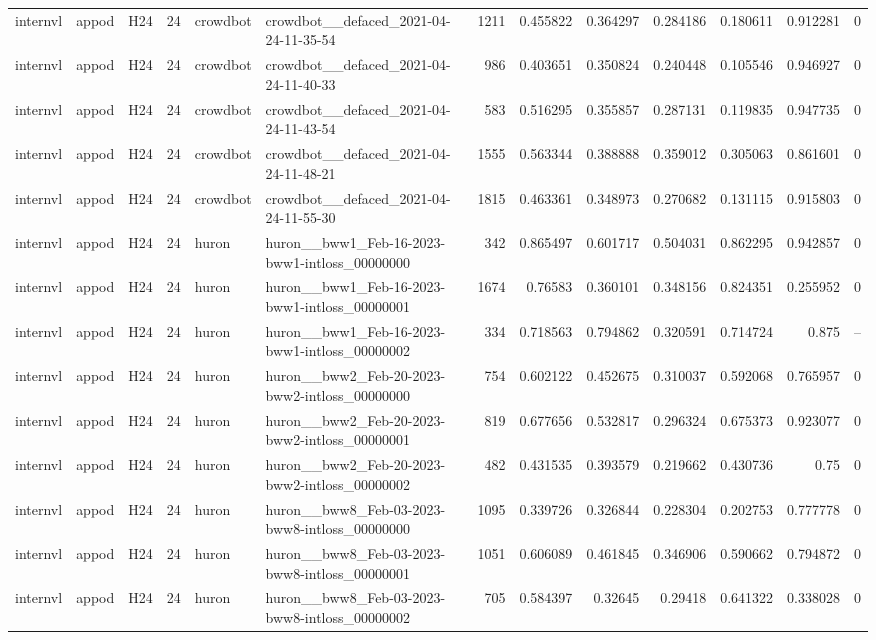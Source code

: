 \begin{longtable}{lllrllrrrrrrr}
internvl & appod & H24 & 24 & crowdbot & crowdbot\_\_defaced\_2021-04-24-11-35-54 & 1211 & 0.455822 & 0.364297 & 0.284186 & 0.180611 & 0.912281 & 0 \\
internvl & appod & H24 & 24 & crowdbot & crowdbot\_\_defaced\_2021-04-24-11-40-33 & 986 & 0.403651 & 0.350824 & 0.240448 & 0.105546 & 0.946927 & 0 \\
internvl & appod & H24 & 24 & crowdbot & crowdbot\_\_defaced\_2021-04-24-11-43-54 & 583 & 0.516295 & 0.355857 & 0.287131 & 0.119835 & 0.947735 & 0 \\
internvl & appod & H24 & 24 & crowdbot & crowdbot\_\_defaced\_2021-04-24-11-48-21 & 1555 & 0.563344 & 0.388888 & 0.359012 & 0.305063 & 0.861601 & 0 \\
internvl & appod & H24 & 24 & crowdbot & crowdbot\_\_defaced\_2021-04-24-11-55-30 & 1815 & 0.463361 & 0.348973 & 0.270682 & 0.131115 & 0.915803 & 0 \\
internvl & appod & H24 & 24 & huron & huron\_\_bww1\_Feb-16-2023-bww1-intloss\_00000000 & 342 & 0.865497 & 0.601717 & 0.504031 & 0.862295 & 0.942857 & 0 \\
internvl & appod & H24 & 24 & huron & huron\_\_bww1\_Feb-16-2023-bww1-intloss\_00000001 & 1674 & 0.76583 & 0.360101 & 0.348156 & 0.824351 & 0.255952 & 0 \\
internvl & appod & H24 & 24 & huron & huron\_\_bww1\_Feb-16-2023-bww1-intloss\_00000002 & 334 & 0.718563 & 0.794862 & 0.320591 & 0.714724 & 0.875 & -- \\
internvl & appod & H24 & 24 & huron & huron\_\_bww2\_Feb-20-2023-bww2-intloss\_00000000 & 754 & 0.602122 & 0.452675 & 0.310037 & 0.592068 & 0.765957 & 0 \\
internvl & appod & H24 & 24 & huron & huron\_\_bww2\_Feb-20-2023-bww2-intloss\_00000001 & 819 & 0.677656 & 0.532817 & 0.296324 & 0.675373 & 0.923077 & 0 \\
internvl & appod & H24 & 24 & huron & huron\_\_bww2\_Feb-20-2023-bww2-intloss\_00000002 & 482 & 0.431535 & 0.393579 & 0.219662 & 0.430736 & 0.75 & 0 \\
internvl & appod & H24 & 24 & huron & huron\_\_bww8\_Feb-03-2023-bww8-intloss\_00000000 & 1095 & 0.339726 & 0.326844 & 0.228304 & 0.202753 & 0.777778 & 0 \\
internvl & appod & H24 & 24 & huron & huron\_\_bww8\_Feb-03-2023-bww8-intloss\_00000001 & 1051 & 0.606089 & 0.461845 & 0.346906 & 0.590662 & 0.794872 & 0 \\
internvl & appod & H24 & 24 & huron & huron\_\_bww8\_Feb-03-2023-bww8-intloss\_00000002 & 705 & 0.584397 & 0.32645 & 0.29418 & 0.641322 & 0.338028 & 0 \\

\end{longtable}
